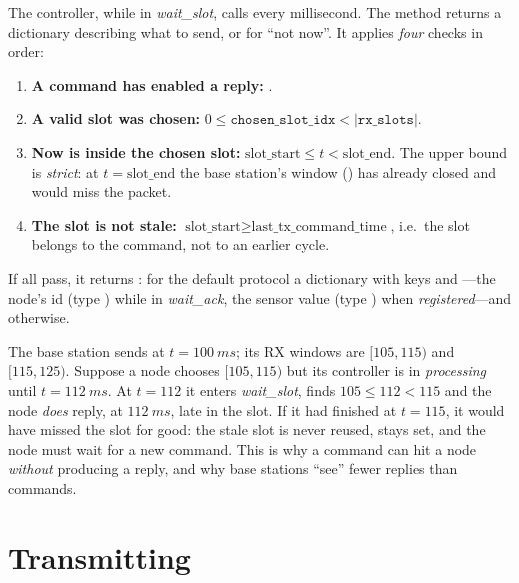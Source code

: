 The controller, while in \emph{wait\_slot}, calls  every millisecond. The method returns a dictionary describing what to send, or  for ``not now''. It applies \emph{four} checks in order:
\begin{enumerate}
 \item \textbf{A command has enabled a reply:} .
 \item \textbf{A valid slot was chosen:} $0\le\texttt{chosen\_slot\_idx}<|\texttt{rx\_slots}|$.
 \item \textbf{Now is inside the chosen slot:} $\text{slot\_start}\le t<\text{slot\_end}$. The upper bound is \emph{strict}: at $t=\text{slot\_end}$ the base station's window () has already closed and would miss the packet.
 \item \textbf{The slot is not stale:} $\text{slot\_start}\ge\text{last\_tx\_command\_time}$, i.e.\ the slot belongs to the command, not to an earlier cycle.
\end{enumerate}
If all pass, it returns : for the default protocol a dictionary with keys  and ---the node's id (type ) while in \emph{wait\_ack}, the sensor value (type ) when \emph{registered}---and  otherwise.

\begin{example}
The base station sends  at $t=\SI{100}{ms}$; its RX windows are $[105,115)$ and $[115,125)$. Suppose a node chooses $[105,115)$ but its controller is in \emph{processing} until $t=\SI{112}{ms}$. At $t=112$ it enters \emph{wait\_slot},  finds $105\le112<115$ and the node \emph{does} reply, at $\SI{112}{ms}$, late in the slot. If it had finished at $t=115$, it would have missed the slot for good: the stale slot is never reused,  stays set, and the node must wait for a new command. This is why a command can hit a node \emph{without} producing a reply, and why base stations ``see'' fewer replies than commands.
\end{example}

\section{Transmitting}
\label{sec:dotx}

